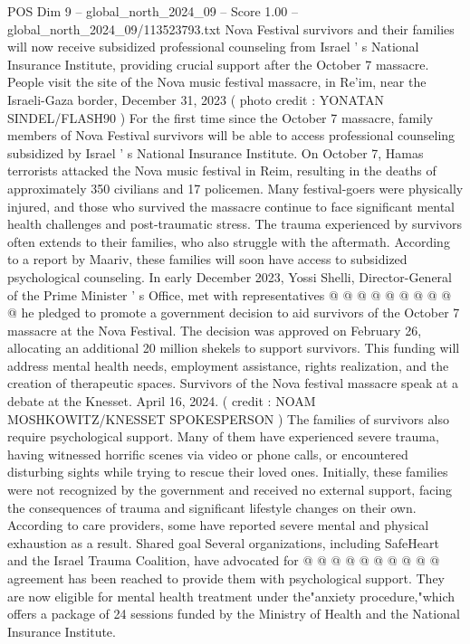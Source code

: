 \begin{textsample}{POS Dim 9 – global\_north\_2024\_09 – Score 1.00 – global\_north\_2024\_09/113523793.txt}  \label{ex:f9_pos_242}
Nova Festival survivors and their families will now receive subsidized professional counseling from Israel ' s National Insurance Institute, providing crucial support after the October 7 massacre.
People visit the site of the Nova music festival massacre, in Re'im, near the Israeli-Gaza border, December 31, 2023 ( photo credit : YONATAN SINDEL/FLASH90 ) For the first time since the October 7 massacre, family members of Nova Festival survivors will be able to access professional counseling subsidized by Israel ' s National Insurance Institute.
On October 7, Hamas terrorists attacked the Nova music festival in Reim, resulting in the deaths of approximately 350 civilians and 17 policemen.
Many festival-goers were physically injured, and those who survived the massacre continue to face significant mental health challenges and post-traumatic stress.
The trauma experienced by survivors often extends to their families, who also struggle with the aftermath.
According to a report by Maariv, these families will soon have access to subsidized psychological counseling.
In early December 2023, Yossi Shelli, Director-General of the Prime Minister ' s Office, met with representatives @ @ @ @ @ @ @ @ @ @ he pledged to promote a government decision to aid survivors of the October 7 massacre at the Nova Festival.
The decision was approved on February 26, allocating an additional 20 million shekels to support survivors.
This funding will address mental health needs, employment assistance, rights realization, and the creation of therapeutic spaces.
Survivors of the Nova festival massacre speak at a debate at the Knesset.
April 16, 2024. ( credit : NOAM MOSHKOWITZ/KNESSET SPOKESPERSON ) The families of survivors also require psychological support.
Many of them have experienced severe trauma, having witnessed horrific scenes via video or phone calls, or encountered disturbing sights while trying to rescue their loved ones.
Initially, these families were not recognized by the government and received no external support, facing the consequences of trauma and significant lifestyle changes on their own.
According to care providers, some have reported severe mental and physical exhaustion as a result.
Shared goal Several organizations, including SafeHeart and the Israel Trauma Coalition, have advocated for @ @ @ @ @ @ @ @ @ @ agreement has been reached to provide them with psychological support.
They are now eligible for mental health treatment under the"anxiety procedure,"which offers a package of 24 sessions funded by the Ministry of Health and the National Insurance Institute.

\end{textsample}
